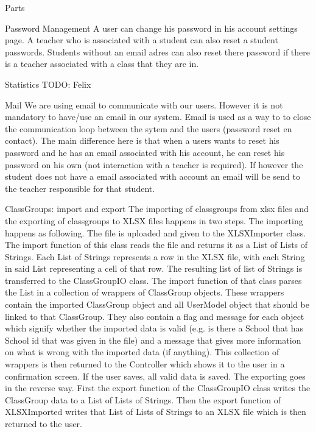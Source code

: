 \documentclass[]{article}
\begin{document}
\begin{section}{Parts}
\begin{subsection}{Password Management}
		A user can change his password in his account settings page. A teacher who is associated with a student 		can also reset a student passwords. Students without an email adres can also reset there password if there 			is a teacher associated with a class that they are in.
    \end{subsection} 
    \begin{subsection}{Statistics}
        TODO: Felix
    \end{subsection}
    \begin{subsection}{Mail}
        We are using email to communicate with our users. However it is not mandatory to have/use an email in our 			system. Email is used as a way to to close the communication loop between the sytem and the users 			(password reset en contact). The main difference here is that when a users wants to reset his password and he has an email associated with his account, he can reset his password on his own (not interaction with a teacher is required). If however the student does not have a email associated with account an email will be send to the teacher responsible for that student. 
    \end{subsection}
    \begin{subsection}{ClassGroups: import and export}
    	The importing of classgroups from xlsx files and the exporting of classgroups to XLSX files happens in two 				steps. 
    	The importing happens as following. The file is uploaded and given to the XLSXImporter class. The 						import function of this class reads the file and returns it as a List of Lists of Strings. Each List of 					Strings represents a row in the XLSX file, with each String in said List representing a cell of that row. The 		resulting list of list of Strings is transferred to the ClassGroupIO class. The import function of that class 		parses the List in a collection of wrappers of ClassGroup objects. These wrappers contain the imported 					ClassGroup object and all UserModel object that should be linked to that ClassGroup. They also contain a 				flag and message for each object which signify whether the imported data is valid (e.g. is there a School 				that has School id that was given in the file) and a message that gives more information on what is wrong 				with the imported data (if anything). This collection of wrappers is then returned to the Controller which 				shows it to the user in a confirmation screen. If the user saves, all valid data is saved.
    	The exporting goes in the reverse way. First the export function of the ClassGroupIO class writes the 					ClassGroup data to a List of Lists of Strings. Then the export function of XLSXImported writes that List of 				Lists of Strings to an XLSX file which is then returned to the user.
        

\end{subsection}
\end{section}
\end{document}
